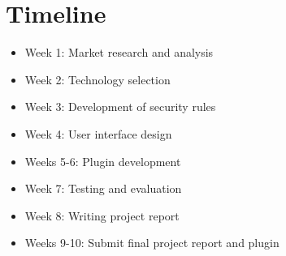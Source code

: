 \documentclass{proposal}
\begin{document}
\section{Timeline}

\begin{itemize}
    \item Week 1: Market research and analysis
    \item Week 2: Technology selection
    \item Week 3: Development of security rules
    \item Week 4: User interface design
    \item Weeks 5-6: Plugin development
    \item Week 7: Testing and evaluation
    \item Week 8: Writing project report
    \item Weeks 9-10: Submit final project report and plugin
\end{itemize}

\end{document}
